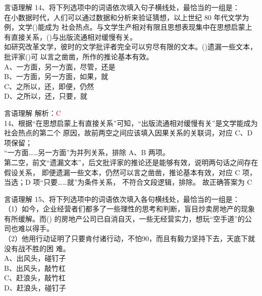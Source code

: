 \documentclass[aspectratio=169]{beamer}
\begin{document}
\begin{frame}[t]{言语理解}
14、将下列选项中的词语依次填入句子横线处，最恰当的一组是：\\
    在小数据时代，人们可以通过数据和分析来验证猜想，以上世纪 80 年代文学为例，文学()能成为
    社会热点。与文学生产相对有限且思想表现集中在思想启蒙上有直接关系，()与出版流通相对缓慢有关。\\
    如研究改革文学，彼时的文学批评者完全可以穷尽有限的文本。()遗漏一些文本，批评家()可
以言之凿凿，所作的推论基本有效。\\
A、一方面，另一方面，尽管，还是\\
B、一方面，另一方面，如果，就\\
C、之所以，还，即便，仍然\\
D、之所以，还，只要，就\\
\end{frame}


\begin{frame}[t]{言语理解}
    解析：\textcolor{red}{C}\\
    14、根据“在思想启蒙上有直接关系”可知，“出版流通相对缓慢有关”是文学能成为社会热点的第二个
原因，故前两空之间应该填入因果关系的关联词，对应 C、D 项保留；\\
    “一方面……另一方面”为并列关系，排除 A、B 两项。\\
    第二空，前文“遗漏文本”，后文批评家的推论还是能够有效，说明两句话之间存在假设关系，
即便遗漏一些文本，仍然可以言之凿凿，推论基本有效，对应 C 项，当选；D 项“只要……就”为条件关系，
不符合文段逻辑，排除。
故正确答案为 C
\end{frame}



\begin{frame}[t]{言语理解}
15、将下列选项中的词语依次填入各句横线处，最恰当的一组是：\\
    （1）如今，企业经营者们都多了一些理性的思考和判断，盲目炒卖房地产的现象有所缓解。而() 的房地产公司已自消自灭，一些无经营实力，想玩“空手道”的公司也难以得手。\\
（2）他用行动证明了只要肯付诸行动，不怕90，而且有毅力坚持下去，天底下就没有战不胜的困
难。\\
A、出风头，碰钉子\\
B、出风头，敲竹杠\\
C、赶浪头，敲竹杠\\
D、赶浪头，碰钉子\\
\end{frame}
\end{document}
